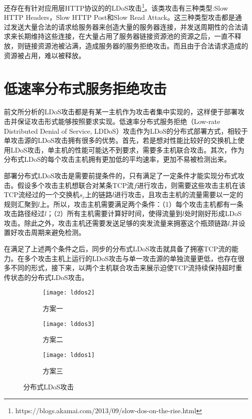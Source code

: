 还存在有针对应用层HTTP协议的的LDoS攻击\footnote{https://blogs.akamai.com/2013/09/slow-dos-on-the-rise.html}。该类攻击有三种类型:Slow HTTP Headers，Slow HTTP Post和Slow Read Attack。这三种类型攻击都是通过发送大量合法的请求给服务器来创造大量的服务器连接，并发送周期性的合法请求来长期维持这些连接，在大量占用了服务器链接资源池的资源之后，一直不释放，则链接资源池被沾满，造成服务器的服务拒绝攻击。而且由于合法请求造成的资源被占用，难以被释放。
\section{低速率分布式服务拒绝攻击}
前文所分析的LDoS攻击都是有某一主机作为攻击者集中实现的，这样便于部署攻击并保证攻击形式能够按照要求实现。低速率分布式服务拒绝（Low-rate Distributed Denial of Service, LDDoS）攻击作为LDoS的分布式部署方式，相较于单攻击源的LDoS攻击拥有很多的优势。首先，若是想对性能比较好的交换机上使用LDoS攻击，单主机的性能可能达不到要求，需要多主机联合攻击。其次，作为分布式LDoS的每个攻击主机拥有更加低的平均速率，更加不易被检测出来。

部署分布式LDoS攻击是需要前提条件的，只有满足了一定条件才能实现分布式攻击。假设多个攻击主机想联合对某条TCP流$f$进行攻击，则需要这些攻击主机在该TCP流经过的一个交换机$s_r$上的链路$l$进行攻击，且攻击主机的流量需要以一定的规则汇聚到$l$上。所以，攻击主机需要满足两个条件：（1）每个攻击主机都有一条攻击路径经过$l$；（2）所有主机需要计算好时间，使得流量到$l$处时刚好形成LDoS攻击。除此之外，攻击主机还需要发送足够的突发流量来拥塞这个瓶颈链路$l$,并设置好攻击周期来避免检测。

在满足了上述两个条件之后，同步的分布式LDoS攻击就具备了拥塞TCP流的能力。在多个攻击主机上运行的LDoS攻击与单一攻击源的单独流量更低，也存在很多不同的形式，接下来，以两个主机联合攻击来展示迫使TCP流持续保持超时重传状态的分布式LDoS攻击。


\begin{figure}
    \vspace{-0.2in}
    \begin{subfigure}{1\textwidth}
        \centering
        \texttt{[image: lddos2]}
        \caption{方案一}
        \label{fig:lldos1}
    \end{subfigure}

    \begin{subfigure}{1\textwidth}
        \centering
        \texttt{[image: lddos3]}
        \caption{方案二}
        \label{fig:lldos2}
    \end{subfigure}

    \begin{subfigure}{1\textwidth}
        \centering
        \texttt{[image: lddos1]}
        \caption{方案三}
        \label{fig:lldos3}
    \end{subfigure}


    \caption{分布式LDoS攻击}
    \label{ffig:lldos}
\end{figure}


